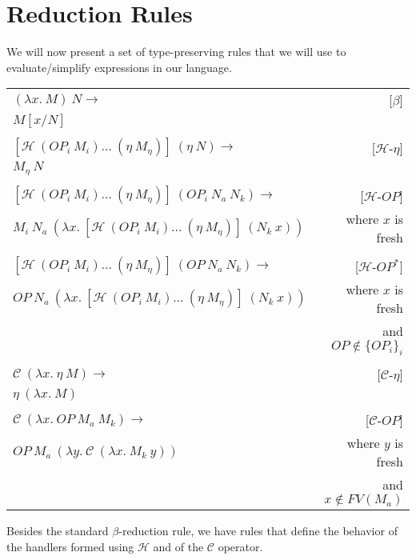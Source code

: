 \section{Reduction Rules}

We will now present a set of type-preserving rules that we will use to
evaluate/simplify expressions in our language.

\vspace{3mm}

\begin{tabular}{lr}
  $(\lambda x.\ M)\ N \rightarrow$ & [$\beta$] \\
  $M[x/N]$ & \\
  \\
  $[\mathcal{H}\ (OP_i\ M_i)\ldots\ (\eta\ M_\eta)]\ (\eta\ N) \rightarrow$ & [$\mathcal{H}$-$\eta$] \\
  $M_\eta\ N$ & \\
  \\
  $[\mathcal{H}\ (OP_i\ M_i)\ldots\ (\eta\ M_\eta)]\ (OP_i\ N_a\ N_k) \rightarrow$ & [$\mathcal{H}$-$OP$] \\
  $M_i\ N_a\ (\lambda x.\ [\mathcal{H}\ (OP_i\ M_i)\ldots\ (\eta\ M_\eta)]\ (N_k\ x))$ & where $x$ is fresh \\
  \\
  $[\mathcal{H}\ (OP_i\ M_i)\ldots\ (\eta\ M_\eta)]\ (OP\ N_a\ N_k) \rightarrow$ & [$\mathcal{H}$-$OP^*$] \\
  $OP\ N_a\ (\lambda x.\ [\mathcal{H}\ (OP_i\ M_i)\ldots\ (\eta\ M_\eta)]\ (N_k\ x))$ & where $x$ is fresh \\
  & and $OP \notin \{OP_i\}_i$ \\
  \\
  $\mathcal{C}\ (\lambda x.\ \eta\ M) \rightarrow$ & [$\mathcal{C}$-$\eta$] \\
  $\eta\ (\lambda x.\ M)$ & \\
  \\
  $\mathcal{C}\ (\lambda x.\ OP\ M_a\ M_k) \rightarrow$ & [$\mathcal{C}$-$OP$] \\
  $OP\ M_a\ (\lambda y.\ \mathcal{C}\ (\lambda x.\ M_k\ y))$ & where $y$ is fresh \\
  & and $x \notin FV(M_a)$
\end{tabular}

\vspace{3mm}

Besides the standard $\beta$-reduction rule, we have rules that define the
behavior of the handlers formed using $\mathcal{H}$ and of the
$\mathcal{C}$ operator.
